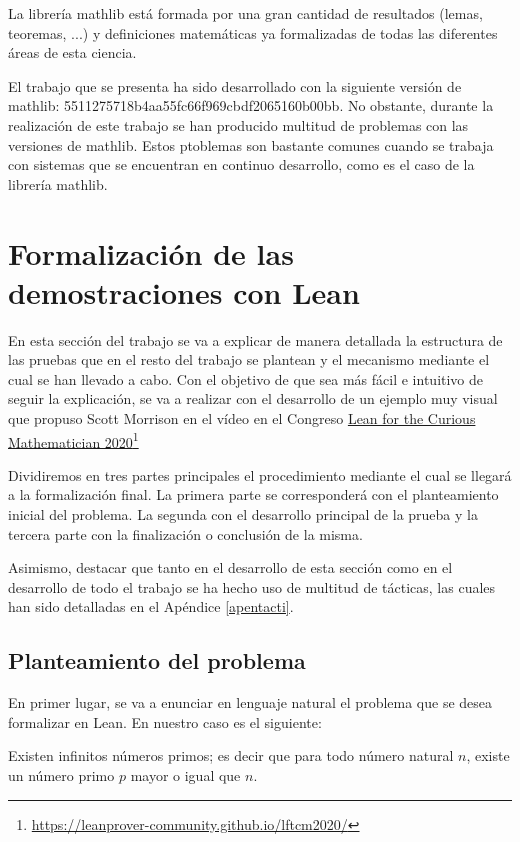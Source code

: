 La librería mathlib está formada por una gran cantidad de resultados (lemas,
teoremas, ...) y definiciones matemáticas ya formalizadas de todas las
diferentes áreas de esta ciencia.

El trabajo que se presenta ha sido desarrollado con la siguiente versión de
mathlib: 5511275718b4aa55fc66f969cbdf2065160b00bb. No obstante, durante la
realización de este trabajo se han producido multitud de problemas con las
versiones de mathlib. Estos ptoblemas son bastante comunes cuando se trabaja
con sistemas que se encuentran en continuo desarrollo, como es el caso de la
librería mathlib.

\section{Formalización de las demostraciones con Lean}

En esta sección del trabajo se va a explicar de manera detallada la
estructura de las pruebas que en el resto del trabajo se plantean y el
mecanismo mediante el cual se han llevado a cabo. Con el objetivo de que
sea más fácil e intuitivo de seguir la explicación, se va a realizar con
el desarrollo de un ejemplo muy visual que propuso Scott Morrison en
el vídeo \cite{video} en el Congreso
\href{https://leanprover-community.github.io/lftcm2020/}
     {Lean for the Curious Mathematician 2020}\footnote{\url{https://leanprover-community.github.io/lftcm2020/}}

Dividiremos en tres partes principales el procedimiento mediante el
cual se llegará a la formalización final. La primera parte se
corresponderá con el planteamiento inicial del problema. La segunda
con el desarrollo principal de la prueba y la tercera parte con la
finalización o conclusión de la misma.

Asimismo, destacar que tanto en el desarrollo de esta sección como en el
desarrollo de todo el trabajo se ha hecho uso de multitud de tácticas, las
cuales han sido detalladas en el Apéndice \ref{apentacti}.

\subsection{Planteamiento del problema}

En primer lugar, se va a enunciar en lenguaje natural el problema que se
desea formalizar en Lean. En nuestro caso es el siguiente:

\begin{teorema}\label{infi}
  Existen infinitos números primos; es decir que para todo número
  natural \(n\), existe un número primo \(p\) mayor o igual que
  \(n\).
\end{teorema}

